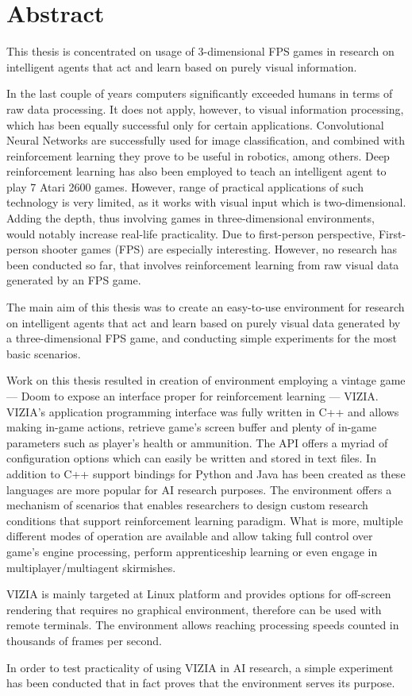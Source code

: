 \chapter*{Abstract}

This thesis is concentrated on usage of 3-dimensional FPS games in research on intelligent agents that act and learn based on purely visual information.


In the last couple of years computers significantly exceeded humans in terms of raw data processing.
It does not apply, however, to visual information processing, which has been equally successful only for certain applications.
Convolutional Neural Networks are successfully used for image classification, and combined with reinforcement learning they prove to be useful in robotics, among others.
Deep reinforcement learning has also been employed to teach an intelligent agent to play 7 Atari 2600 games.
However, range of practical applications of such technology is very limited, as it works with visual input which is two-dimensional.
Adding the depth, thus involving games in three-dimensional environments, would notably increase real-life practicality.
Due to first-person perspective, First-person shooter games (FPS) are especially interesting. However, no research has been conducted so far, that involves reinforcement learning from raw visual data generated by an FPS game.

The main aim of this thesis was to create an easy-to-use environment for research on intelligent agents that act and learn based on purely visual data generated by a three-dimensional FPS game, and conducting simple experiments for the most basic scenarios.


Work on this thesis resulted in creation of environment employing a vintage game --- Doom to expose an interface proper for reinforcement learning --- VIZIA. VIZIA's application programming interface was fully written in C++ and allows making in-game actions, retrieve game's screen buffer and plenty of in-game parameters such as player's health or ammunition. 
The API offers a myriad of configuration options which can easily be written and stored in text files.
In addition to C++ support bindings for Python and Java has been created as these languages are more popular for AI research purposes. 
The environment offers a mechanism of scenarios that enables researchers to design custom research conditions that support reinforcement learning paradigm.
What is more, multiple different modes of operation are available and allow taking full control over game's engine processing, perform apprenticeship learning or even engage in multiplayer/multiagent skirmishes. 

VIZIA is mainly targeted at Linux platform and provides options for off-screen rendering that requires no graphical environment, therefore can be used with remote terminals.
The environment allows reaching processing speeds counted in thousands of frames per second.

In order to test practicality of using VIZIA in AI research, a simple experiment has been conducted that in fact proves that the environment serves its purpose.
